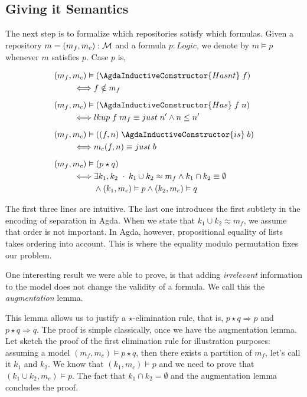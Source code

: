 \documentclass{llncs}
\newcommand{\IC}[1]{\AgdaInductiveConstructor{#1}}
\begin{document}
\subsection{Giving it Semantics}

The next step is to formalize which repositories satisfy which formulas. 
Given a repository $m = (m_f , m_c) : \mathcal{M}$ and a formula $p : Logic$, we denote
by $m \vDash p$ whenever $m$ satisfies $p$. Case $p$ is,

\begin{align*}
  (m_f , m_c) \vDash & \; (\IC{Hasnt}\; f) \\
               \iff  & f \notin m_f \\[2mm]
  (m_f , m_c) \vDash & \; (\IC{Has}\; f\; n) \\
               \iff  & lkup\;f\;m_f \equiv just\; n' \wedge n \leq n'\\[2mm]
  (m_f , m_c) \vDash & \; ((f , n)\; \IC{is}\; b) \\
               \iff  & m_c (f , n) \equiv just\; b \\[2mm]
  (m_f , m_c) \vDash & \; (p \star q) \\
               \iff  & \exists k_1 , k_2\;\cdot\; k_1 \cup k_2 \approx m_f
                       \wedge k_1 \cap k_2 \equiv \emptyset \\
                     & \wedge (k_1 , m_c) \vDash p
                       \wedge (k_2 , m_c) \vDash q
\end{align*}

The first three lines are intuitive. The last one introduces the first subtlety in the
encoding of separation in Agda. When we state that $k_1 \cup k_2 \approx m_f$, we
assume that order is not important. In Agda, however, propositional equality
of lists takes ordering into account. This is where the equality modulo permutation
fixes our problem.

One interesting result we were able to prove, is that adding \emph{irrelevant}
information to the model does not change the validity of a formula. We call this
the \emph{augmentation} lemma.


This lemma allows us to justify a $\star$-elimination rule, that is,
$p \star q \Rightarrow p$ and $p \star q \Rightarrow q$. The proof is
simple classically, once we have the augmentation lemma. 
Let sketch the proof of the first elimination rule for illustration
purposes: assuming a model $(m_f , m_c) \vDash p \star q$, then
there exists a partition of $m_f$, let's call it $k_1$ and $k_2$.
We know that $(k_1 , m_c) \vDash p$ and we need to prove that
$(k_1 \cup k_2 , m_c) \vDash p$. The fact that $k_1 \cap k_2 = \emptyset$
and the augmentation lemma concludes the proof.
\end{document}
